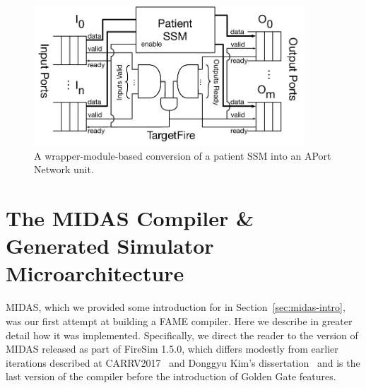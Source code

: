 \begin{figure}
    \centering
    \includegraphics[width=0.9\textwidth]{figures/aport-network-wrapper.pdf}
    \caption{A wrapper-module-based conversion of a patient SSM into an APort Network unit.}
    \label{fig:aport-network-wrapper}
\end{figure}

\section{The MIDAS Compiler \& Generated Simulator Microarchitecture}\label{sec:midas-impl}
MIDAS, which we provided some introduction for in Section~\ref{sec:midas-intro},
was our first attempt at building a FAME compiler. Here we describe in greater
detail how it was implemented. Specifically, we direct the reader to the
version of MIDAS released as part of FireSim 1.5.0, which differs modestly from
earlier iterations described at CARRV2017~\cite{MIDAS} and Donggyu Kim's
dissertation~\cite{DGKDissertation} and is the last version of the compiler
before the introduction of Golden Gate features.

